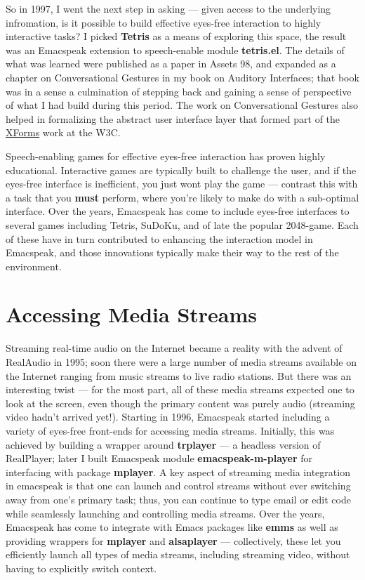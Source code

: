\documentclass[11pt]{article}
\begin{document}
So in 1997, I went the next step in asking — given access to the
underlying infromation, is it possible to build effective
eyes-free interaction to highly interactive tasks? I picked
\textbf{Tetris} as a means of exploring this space, the result was an
Emacspeak extension to speech-enable module \textbf{tetris.el}. The
details of what was learned were published as a paper in Assets
98, and expanded as a chapter on Conversational Gestures in my
book on Auditory Interfaces; that book was in a sense a
culmination of stepping back and gaining a sense of perspective
of what I had build during this period. The work on
Conversational Gestures also helped in formalizing the abstract
user interface layer that formed part of the
\href{http://www.w3.org/MarkUp/Forms/}{XForms} work at the W3C.

Speech-enabling games for effective eyes-free interaction has
proven highly educational. Interactive games are typically built
to challenge the user, and if the eyes-free interface is
inefficient, you just wont play the game — contrast this with a
task that you \textbf{must} perform, where you're likely to make do with
a sub-optimal interface. Over the years, Emacspeak has come to
include eyes-free interfaces to several games including Tetris,
SuDoKu, and of late the popular 2048-game. Each of these have in
turn contributed to enhancing the interaction model in Emacspeak,
and those innovations typically make their way to the rest of the
environment.


\section{Accessing Media Streams}
\label{sec-10}

Streaming real-time audio on the Internet became a reality with
the advent of RealAudio in 1995; soon there were a large number
of media streams available on the Internet ranging from music
streams to live radio stations. But there was an interesting
twist — for the most part, all of these media streams expected
one to look at the screen, even though the primary content was
purely audio (streaming video hadn't arrived yet!). Starting in
1996, Emacspeak started including a variety of eyes-free
front-ends for accessing media streams. Initially, this was
achieved by building a wrapper around \textbf{trplayer} — a headless
version of RealPlayer; later I built Emacspeak module
\textbf{emacspeak-m-player} for interfacing with package \textbf{mplayer}. A
key aspect of streaming media integration in emacspeak is that
one can launch and control streams without ever switching away
from one's primary task; thus, you can continue to type email or
edit code while seamlessly launching and controlling media
streams. Over the years, Emacspeak has come to integrate with
Emacs packages like \textbf{emms} as well as providing wrappers for
\textbf{mplayer} and \textbf{alsaplayer} — collectively, these let you
efficiently launch all types of media streams, including
streaming video, without having to explicitly switch context.
\end{document}
